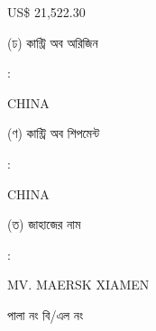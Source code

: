 \documentclass[12pt]{article}
\newcommand{\co}{CHINA}
\newcommand{\coship}{CHINA}
\newcommand{\vessel}{MV. MAERSK XIAMEN}
\newcommand{\price}{US\$ 21,522.30}
\begin{document}
\begin{minipage}[t]{0.53\linewidth}
{\price}
\\
\end{minipage}
\begin{minipage}[t]{0.05\linewidth}
\hspace*{1em}
\end{minipage}
\begin{minipage}[t]{0.40\linewidth}
(ঢ) কান্ট্রি অব অরিজিন
\end{minipage}
\begin{minipage}[t]{0.02\linewidth}
:
\end{minipage}
\begin{minipage}[t]{0.53\linewidth}
{\co}
\\
\end{minipage}
\begin{minipage}[t]{0.05\linewidth}
\hspace*{1em}
\end{minipage}
\begin{minipage}[t]{0.40\linewidth}
(ণ) কান্ট্রি অব শিপমেন্ট
\end{minipage}
\begin{minipage}[t]{0.02\linewidth}
:
\end{minipage}
\begin{minipage}[t]{0.53\linewidth}
{\coship}
\\
\end{minipage}
\begin{minipage}[t]{0.05\linewidth}
\hspace*{1em}
\end{minipage}
\begin{minipage}[t]{0.40\linewidth}
(ত) জাহাজের নাম
\end{minipage}
\begin{minipage}[t]{0.02\linewidth}
:
\end{minipage}
\begin{minipage}[t]{0.53\linewidth}
{\vessel}
\end{minipage}
\begin{minipage}[t]{0.05\linewidth}
\hspace*{1em}
\end{minipage}
\begin{minipage}[t]{0.40\linewidth}
\hspace*{1.8em}পালা নং বি/এল নং
\end{minipage}
\begin{minipage}[t]{0.02\linewidth}
\hspace{1em}
\end{minipage}
\end{document}
